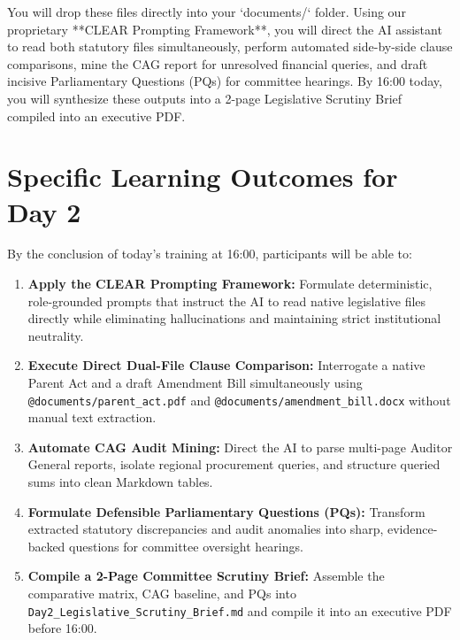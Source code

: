 \documentclass[11pt, a4paper]{report}
\begin{document}
You will drop these files directly into your `documents/` folder. Using our proprietary **CLEAR Prompting Framework**, you will direct the AI assistant to read both statutory files simultaneously, perform automated side-by-side clause comparisons, mine the CAG report for unresolved financial queries, and draft incisive Parliamentary Questions (PQs) for committee hearings. By 16:00 today, you will synthesize these outputs into a 2-page Legislative Scrutiny Brief compiled into an executive PDF.

\section{Specific Learning Outcomes for Day 2}
By the conclusion of today's training at 16:00, participants will be able to:
\begin{enumerate}[label=\textbf{2.\arabic*}]
    \item \textbf{Apply the CLEAR Prompting Framework:} Formulate deterministic, role-grounded prompts that instruct the AI to read native legislative files directly while eliminating hallucinations and maintaining strict institutional neutrality.
    \item \textbf{Execute Direct Dual-File Clause Comparison:} Interrogate a native Parent Act and a draft Amendment Bill simultaneously using \texttt{@documents/parent\_act.pdf} and \texttt{@documents/amendment\_bill.docx} without manual text extraction.
    \item \textbf{Automate CAG Audit Mining:} Direct the AI to parse multi-page Auditor General reports, isolate regional procurement queries, and structure queried sums into clean Markdown tables.
    \item \textbf{Formulate Defensible Parliamentary Questions (PQs):} Transform extracted statutory discrepancies and audit anomalies into sharp, evidence-backed questions for committee oversight hearings.
    \item \textbf{Compile a 2-Page Committee Scrutiny Brief:} Assemble the comparative matrix, CAG baseline, and PQs into \texttt{Day2\_Legislative\_Scrutiny\_Brief.md} and compile it into an executive PDF before 16:00.
\end{enumerate}
\end{document}
